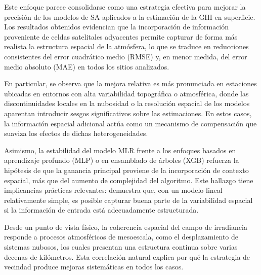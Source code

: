 \documentclass[letterpaper,12pt, twoside]{report}
\providecommand{\DIFdeltex}[1]{{\protect\color{red} \scriptsize #1}} %
\providecommand{\DIFdel}[1]{\texorpdfstring{\DIFdeltex{#1}}{}} %
\begin{document}

\DIFdel{Este enfoque parece consolidarse como una estrategia efectiva para mejorar la precisión de los modelos de SA aplicados a la estimación de la GHI en superficie. Los resultados obtenidos evidencian que la incorporación de información proveniente de celdas satelitales adyacentes permite capturar de forma más realista la estructura espacial de la atmósfera, lo que se traduce en reducciones consistentes del error cuadrático medio (RMSE) y, en menor medida, del error medio absoluto (MAE) en todos los sitios analizados.
}%

\DIFdel{En particular, se observa que la mejora relativa es más pronunciada en estaciones ubicadas en entornos con alta variabilidad topográfica o atmosférica, donde las discontinuidades locales en la nubosidad o la resolución espacial de los modelos aparentan introducir sesgos significativos sobre las estimaciones. En estos casos, la información espacial adicional actúa como un mecanismo de compensación que suaviza los efectos de dichas heterogeneidades.
}%

\DIFdel{Asimismo, la estabilidad del modelo MLR frente a los enfoques basados en aprendizaje profundo (MLP) o en ensamblado de árboles (XGB) refuerza la hipótesis de que la ganancia principal proviene de la incorporación de contexto espacial, más que del aumento de complejidad del algoritmo. Este hallazgo tiene implicancias prácticas relevantes: demuestra que, con un modelo lineal relativamente simple, es posible capturar buena parte de la variabilidad espacial si la información de entrada está adecuadamente estructurada.
}%

\DIFdel{Desde un punto de vista físico, la coherencia espacial del campo de irradiancia responde a procesos atmosféricos de mesoescala, como el desplazamiento de sistemas nubosos, los cuales presentan una estructura continua sobre varias decenas de kilómetros. Esta correlación natural explica por qué la estrategia de vecindad produce mejoras sistemáticas en todos los casos.
}%
\end{document}
